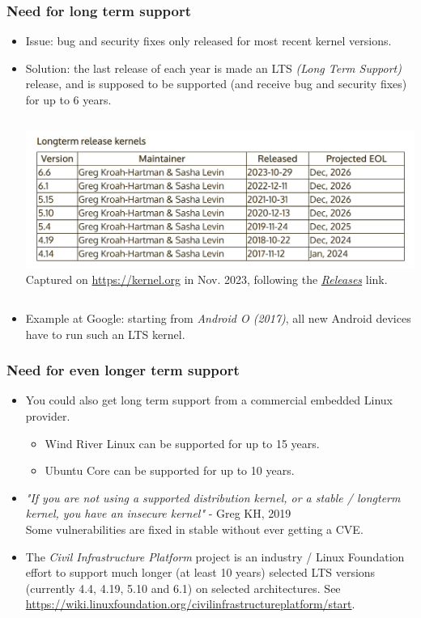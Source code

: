 \begin{frame}[fragile]
  \frametitle{Need for long term support}
  \begin{itemize}
  \item Issue: bug and security fixes only released for most recent
    kernel versions.
  \item Solution: the last release of each year is made an LTS {\em (Long Term
     Support)} release, and is supposed to be supported (and receive bug
    and security fixes) for up to 6 years.
  \begin{columns}
  \includegraphics[width=\textwidth]{common/long-term-support-kernels.png}\\
  \scriptsize
   Captured on \url{https://kernel.org} in Nov. 2023, following the
   \href{https://www.kernel.org/category/releases.html}{\em Releases} link.
  \end{columns}
  \item Example at Google: starting from {\em Android O (2017)}, all new Android devices
    have to run such an LTS kernel.
  \end{itemize}
\end{frame}

\begin{frame}[fragile]
  \frametitle{Need for even longer term support}
  \begin{itemize}
  \item You could also get long term support from a commercial embedded
    Linux provider.
    \begin{itemize}
	\item Wind River Linux can be supported for up to 15 years.
	\item Ubuntu Core can be supported for up to 10 years.
    \end{itemize}
  \item {\em "If you are not using a supported distribution kernel, or a stable / longterm
    kernel, you have an insecure kernel"} - Greg KH, 2019\\
    Some vulnerabilities are fixed in stable without ever getting a CVE.
  \item The {\em Civil Infrastructure Platform} project is an industry /
    Linux Foundation effort to support much longer (at least 10 years)
    selected LTS versions (currently 4.4, 4.19, 5.10 and 6.1) on selected architectures.
    See \url{https://wiki.linuxfoundation.org/civilinfrastructureplatform/start}.
  \end{itemize}
\end{frame}

